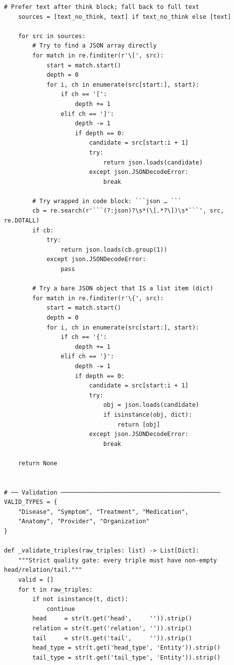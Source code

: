 \documentclass[11pt]{article}
\begin{document}
\begin{lstlisting}[style=pythoncode, caption={kg\_generator\_gpu\_0.py}]
    # Prefer text after think block; fall back to full text
    sources = [text_no_think, text] if text_no_think else [text]

    for src in sources:
        # Try to find a JSON array directly
        for match in re.finditer(r'\[', src):
            start = match.start()
            depth = 0
            for i, ch in enumerate(src[start:], start):
                if ch == '[':
                    depth += 1
                elif ch == ']':
                    depth -= 1
                    if depth == 0:
                        candidate = src[start:i + 1]
                        try:
                            return json.loads(candidate)
                        except json.JSONDecodeError:
                            break

        # Try wrapped in code block: ```json … ```
        cb = re.search(r'```(?:json)?\s*(\[.*?\])\s*```', src, re.DOTALL)
        if cb:
            try:
                return json.loads(cb.group(1))
            except json.JSONDecodeError:
                pass

        # Try a bare JSON object that IS a list item (dict)
        for match in re.finditer(r'\{', src):
            start = match.start()
            depth = 0
            for i, ch in enumerate(src[start:], start):
                if ch == '{':
                    depth += 1
                elif ch == '}':
                    depth -= 1
                    if depth == 0:
                        candidate = src[start:i + 1]
                        try:
                            obj = json.loads(candidate)
                            if isinstance(obj, dict):
                                return [obj]
                        except json.JSONDecodeError:
                            break

    return None


# ── Validation ─────────────────────────────────────────────
VALID_TYPES = {
    "Disease", "Symptom", "Treatment", "Medication",
    "Anatomy", "Provider", "Organization"
}

def _validate_triples(raw_triples: list) -> List[Dict]:
    """Strict quality gate: every triple must have non-empty head/relation/tail."""
    valid = []
    for t in raw_triples:
        if not isinstance(t, dict):
            continue
        head     = str(t.get('head',     '')).strip()
        relation = str(t.get('relation', '')).strip()
        tail     = str(t.get('tail',     '')).strip()
        head_type = str(t.get('head_type', 'Entity')).strip()
        tail_type = str(t.get('tail_type', 'Entity')).strip()


\end{lstlisting}
\end{document}
